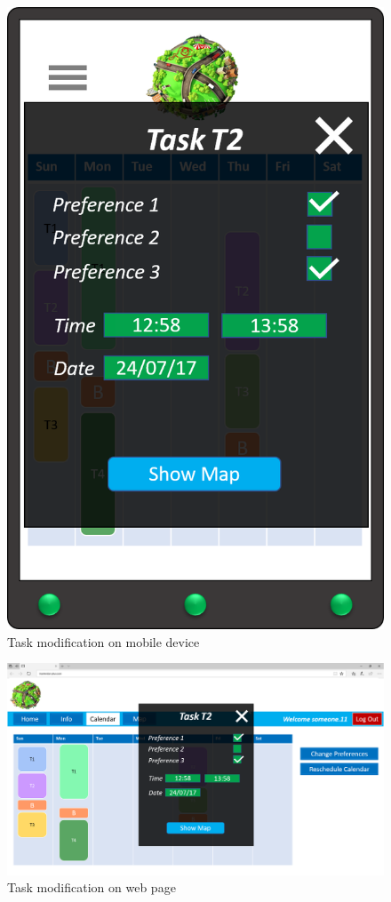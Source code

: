 \begin{figure}[H]
    \centering
    \includegraphics[scale=0.3]{Pictures/Mockups/AppTask.png}
    \caption{Task modification on mobile device}
\end{figure}

\begin{figure}[H]
    \centering
    \includegraphics[scale=0.25]{Pictures/Mockups/SiteTask.png}
    \caption{Task modification on web page}
\end{figure}

